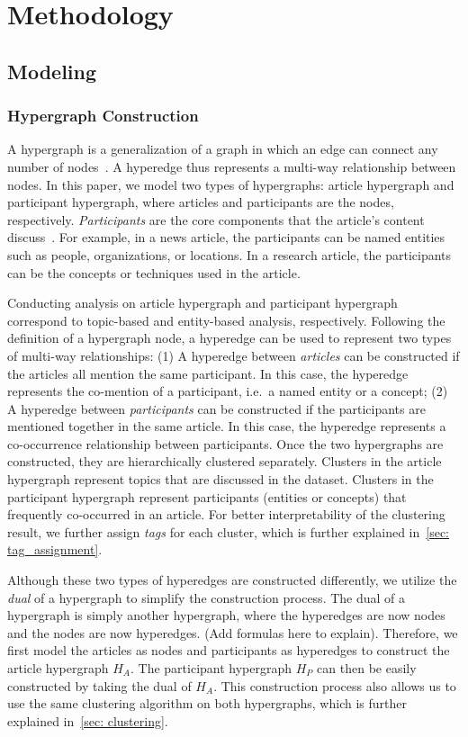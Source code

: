 \section{Methodology}\label{sec: methodology}
\subsection{Modeling}
\subsubsection{Hypergraph Construction}
A hypergraph is a generalization of a graph in which an edge can connect any number of nodes~\cite{fischer2021hypergraphsurvey}.
A hyperedge thus represents a multi-way relationship between nodes.
In this paper, we model two types of hypergraphs: article hypergraph and participant hypergraph, where articles and participants are the nodes, respectively.
\textit{Participants} are the core components that the article's content discuss~\cite{use_other_works_to_refine_definition}.
For example, in a news article, the participants can be named entities such as people, organizations, or locations.
In a research article, the participants can be the concepts or techniques used in the article.

Conducting analysis on article hypergraph and participant hypergraph correspond to topic-based and entity-based analysis, respectively.
Following the definition of a hypergraph node, a hyperedge can be used to represent two types of multi-way relationships:
(1) A hyperedge between \textit{articles} can be constructed if the articles all mention the same participant. 
In this case, the hyperedge represents the co-mention of a participant, i.e.\ a named entity or a concept;
(2) A hyperedge between \textit{participants} can be constructed if the participants are mentioned together in the same article.
In this case, the hyperedge represents a co-occurrence relationship between participants.
Once the two hypergraphs are constructed, they are hierarchically clustered separately.
Clusters in the article hypergraph represent topics that are discussed in the dataset.
Clusters in the participant hypergraph represent participants (entities or concepts) that frequently co-occurred in an article.
For better interpretability of the clustering result, we further assign \textit{tags} for each cluster, which is further explained in~\autoref{sec: tag_assignment}.

Although these two types of hyperedges are constructed differently, we utilize the \textit{dual} of a hypergraph to simplify the construction process.
The dual of a hypergraph is simply another hypergraph, where the hyperedges are now nodes and the nodes are now hyperedges. (Add formulas here to explain).
Therefore, we first model the articles as nodes and participants as hyperedges to construct the article hypergraph $H_A$.
The participant hypergraph $H_P$ can then be easily constructed by taking the dual of $H_A$.
This construction process also allows us to use the same clustering algorithm on both hypergraphs, which is further explained in~\autoref{sec: clustering}.

